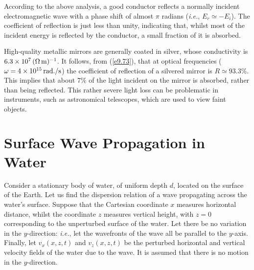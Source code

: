 According to the above analysis, a good conductor reflects a  normally incident
electromagnetic wave with a phase shift of almost $\pi$ radians ({\em i.e.}, $E_r\simeq -E_i$). The coefficient of reflection is just less than unity, indicating that, whilst most
of the incident energy is reflected by the conductor, a small fraction of it
is absorbed. 

High-quality metallic mirrors are generally coated in silver, whose conductivity
is $6.3\times 10^7\,(\Omega\,{\rm m})^{-1}$. It follows, from (\ref{e9.73}), that  at optical
frequencies ($\omega = 4\times 10^{15}\,{\rm rad./s}$) the coefficient
of reflection of a silvered mirror is $R\simeq 93.3\%$. This implies that
about $7\%$ of the light incident on  the mirror is absorbed, rather than being reflected. This rather severe light loss can be
problematic in instruments, such as astronomical telescopes, which are used to
view faint objects.

\section{Surface Wave Propagation in Water}\label{s9.4}
Consider a stationary body of water, of uniform depth $d$, located on the surface of the Earth. Let us
find the dispersion relation of a   wave propagating across the water's surface. Suppose that the Cartesian coordinate $x$ measures horizontal distance,
whilst the coordinate $z$ measures vertical height, with $z=0$ corresponding to the unperturbed surface of the water. 
Let there be no variation in the $y$-direction: {\em i.e.}, let the wavefronts of the wave all be parallel to the $y$-axis. Finally, let $v_x(x,z,t)$ and $v_z(x,z,t)$ be the perturbed horizontal and
vertical velocity fields of the water due to the wave. It is assumed that there is no
motion in the $y$-direction. 

